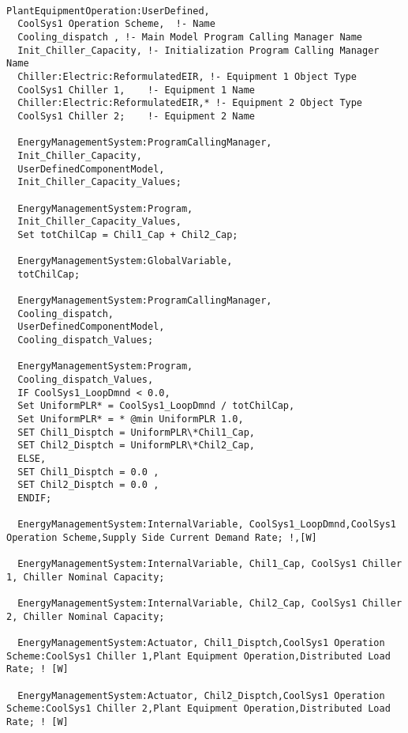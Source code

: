 \begin{lstlisting}

PlantEquipmentOperation:UserDefined,
  CoolSys1 Operation Scheme,  !- Name
  Cooling_dispatch , !- Main Model Program Calling Manager Name
  Init_Chiller_Capacity, !- Initialization Program Calling Manager Name
  Chiller:Electric:ReformulatedEIR, !- Equipment 1 Object Type
  CoolSys1 Chiller 1,    !- Equipment 1 Name
  Chiller:Electric:ReformulatedEIR,* !- Equipment 2 Object Type
  CoolSys1 Chiller 2;    !- Equipment 2 Name

  EnergyManagementSystem:ProgramCallingManager,
  Init_Chiller_Capacity,
  UserDefinedComponentModel,
  Init_Chiller_Capacity_Values;

  EnergyManagementSystem:Program,
  Init_Chiller_Capacity_Values,
  Set totChilCap = Chil1_Cap + Chil2_Cap;

  EnergyManagementSystem:GlobalVariable,
  totChilCap;

  EnergyManagementSystem:ProgramCallingManager,
  Cooling_dispatch,
  UserDefinedComponentModel,
  Cooling_dispatch_Values;

  EnergyManagementSystem:Program,
  Cooling_dispatch_Values,
  IF CoolSys1_LoopDmnd < 0.0,
  Set UniformPLR* = CoolSys1_LoopDmnd / totChilCap,
  Set UniformPLR* = * @min UniformPLR 1.0,
  SET Chil1_Disptch = UniformPLR\*Chil1_Cap,
  SET Chil2_Disptch = UniformPLR\*Chil2_Cap,
  ELSE,
  SET Chil1_Disptch = 0.0 ,
  SET Chil2_Disptch = 0.0 ,
  ENDIF;

  EnergyManagementSystem:InternalVariable, CoolSys1_LoopDmnd,CoolSys1 Operation Scheme,Supply Side Current Demand Rate; !,[W]

  EnergyManagementSystem:InternalVariable, Chil1_Cap, CoolSys1 Chiller 1, Chiller Nominal Capacity;

  EnergyManagementSystem:InternalVariable, Chil2_Cap, CoolSys1 Chiller 2, Chiller Nominal Capacity;

  EnergyManagementSystem:Actuator, Chil1_Disptch,CoolSys1 Operation Scheme:CoolSys1 Chiller 1,Plant Equipment Operation,Distributed Load Rate; ! [W]

  EnergyManagementSystem:Actuator, Chil2_Disptch,CoolSys1 Operation Scheme:CoolSys1 Chiller 2,Plant Equipment Operation,Distributed Load Rate; ! [W]
\end{lstlisting}